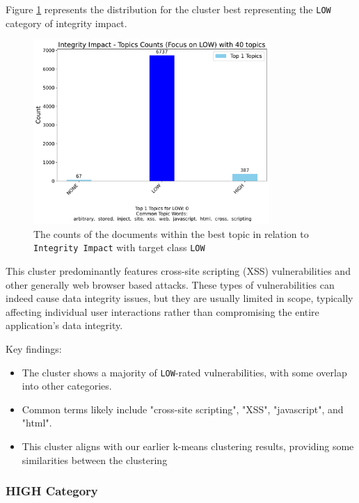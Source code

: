 \documentclass[12pt]{article}
\begin{document}
Figure \ref{fig:integrityImpact_60_LOW} represents the distribution for the cluster best representing the \texttt{LOW} category of integrity impact.

\begin{figure}[ht]
	\centering
	\includegraphics[width=0.8\textwidth]{figures/integrityImpact/merged_top_k_topics_category_focus_counts_integrityImpact_LOW_k1.pdf}
	\caption{The counts of the documents within the best topic in relation to \texttt{Integrity Impact} with target class \texttt{LOW}}
	\label{fig:integrityImpact_60_LOW}
\end{figure}

This cluster predominantly features cross-site scripting (XSS) vulnerabilities and other generally
web browser based attacks. These types of vulnerabilities can indeed cause data integrity issues, but
they are usually limited in scope, typically affecting individual user interactions rather than
compromising the entire application's data integrity.

Key findings:
\begin{itemize}

	\item The cluster shows a majority of \texttt{LOW}-rated vulnerabilities, with some overlap into
	      other categories.

	\item Common terms likely include "cross-site scripting", "XSS", "javascript", and "html".

	\item This cluster aligns with our earlier k-means clustering results, providing some
	      similarities between the clustering
\end{itemize}

\subsubsection*{HIGH Category}
\end{document}
